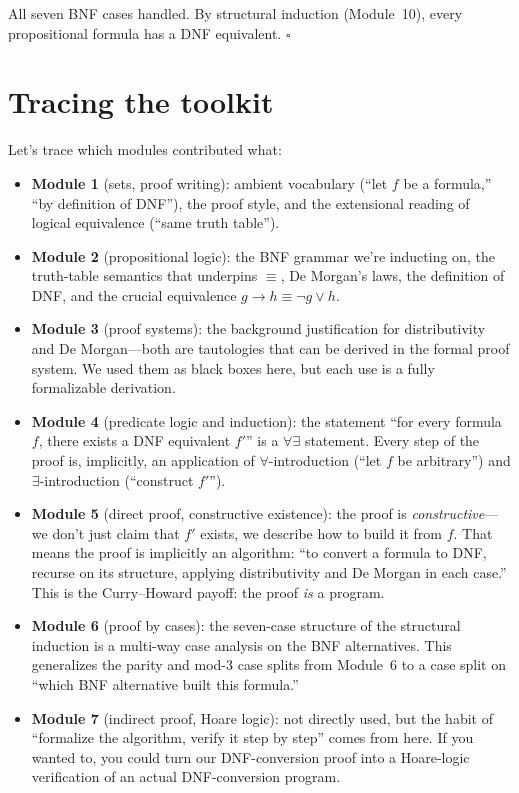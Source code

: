 \documentclass[11pt]{article}
\begin{document}
All seven BNF cases handled. By structural induction (Module~10), every propositional formula has a DNF equivalent. \hfill$\square$

\section*{Tracing the toolkit}

Let's trace which modules contributed what:

\begin{itemize}
  \item \textbf{Module 1} (sets, proof writing): ambient vocabulary (``let $f$ be a formula,'' ``by definition of DNF''), the proof style, and the extensional reading of logical equivalence (``same truth table'').
  \item \textbf{Module 2} (propositional logic): the BNF grammar we're inducting on, the truth-table semantics that underpins $\equiv$, De Morgan's laws, the definition of DNF, and the crucial equivalence $g \to h \equiv \lnot g \vee h$.
  \item \textbf{Module 3} (proof systems): the background justification for distributivity and De Morgan---both are tautologies that can be derived in the formal proof system. We used them as black boxes here, but each use is a fully formalizable derivation.
  \item \textbf{Module 4} (predicate logic and induction): the statement ``for every formula $f$, there exists a DNF equivalent $f'$'' is a $\forall\exists$ statement. Every step of the proof is, implicitly, an application of $\forall$-introduction (``let $f$ be arbitrary'') and $\exists$-introduction (``construct $f'$'').
  \item \textbf{Module 5} (direct proof, constructive existence): the proof is \emph{constructive}---we don't just claim that $f'$ exists, we describe how to build it from $f$. That means the proof is implicitly an algorithm: ``to convert a formula to DNF, recurse on its structure, applying distributivity and De Morgan in each case.'' This is the Curry--Howard payoff: the proof \emph{is} a program.
  \item \textbf{Module 6} (proof by cases): the seven-case structure of the structural induction is a multi-way case analysis on the BNF alternatives. This generalizes the parity and mod-3 case splits from Module~6 to a case split on ``which BNF alternative built this formula.''
  \item \textbf{Module 7} (indirect proof, Hoare logic): not directly used, but the habit of ``formalize the algorithm, verify it step by step'' comes from here. If you wanted to, you could turn our DNF-conversion proof into a Hoare-logic verification of an actual DNF-conversion program.

\end{itemize}
\end{document}
